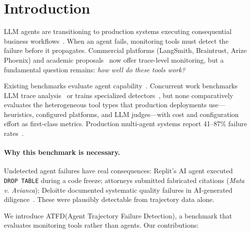 \documentclass[11pt]{article}
\newcommand{\atfd}{\textsc{ATFD}\xspace}
\begin{document}
\section{Introduction}
\label{sec:introduction}

LLM agents are transitioning to production systems executing consequential
business workflows~\citep{zenml2025production}. When an agent fails,
monitoring tools must detect the failure before it propagates. Commercial
platforms (LangSmith, Braintrust, Arize Phoenix) and academic
proposals~\citep{moshkovich2025beyond} now offer trace-level monitoring,
but a fundamental question remains: \emph{how well do these tools work?}

Existing benchmarks evaluate agent capability~\citep{jimenez2024swebench,
yao2025taubench}. Concurrent work benchmarks LLM trace
analysis~\citep{trail2025} or trains specialized
detectors~\citep{trajad2025,silentfailures2025}, but none comparatively
evaluates the heterogeneous tool types that production deployments
use---heuristics, configured platforms, and LLM judges---with cost and
configuration effort as first-class metrics. Production multi-agent
systems report 41--87\% failure rates~\citep{zenml2025production,
cemri2025mast}.

\paragraph{Why this benchmark is necessary.}
Undetected agent failures have real consequences: Replit's AI agent
executed \texttt{DROP TABLE} during a code freeze; attorneys submitted
fabricated citations (\emph{Mata v. Avianca}); Deloitte documented
systematic quality failures in AI-generated
diligence~\citep{deloitte2025hallucinations}. These were plausibly
detectable from trajectory data alone.

We introduce \atfd (Agent Trajectory Failure Detection), a benchmark
that evaluates monitoring tools rather than agents. Our contributions:
\end{document}
